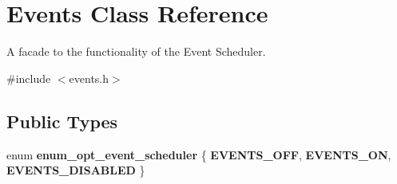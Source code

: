 \hypertarget{classEvents}{}\section{Events Class Reference}
\label{classEvents}


A facade to the functionality of the Event Scheduler.  




{\ttfamily \#include $<$events.\+h$>$}

\subsection*{Public Types}
\begin{DoxyCompactItemize}
\item 
\mbox{\label{classEvents_aaa3c23838f7bd6c60010b8ebbd5f8383}} 
enum {\bfseries enum\+\_\+opt\+\_\+event\+\_\+scheduler} \{ {\bfseries E\+V\+E\+N\+T\+S\+\_\+\+O\+FF}, 
{\bfseries E\+V\+E\+N\+T\+S\+\_\+\+ON}, 
{\bfseries E\+V\+E\+N\+T\+S\+\_\+\+D\+I\+S\+A\+B\+L\+ED}
 \}
\end{DoxyCompactItemize}
